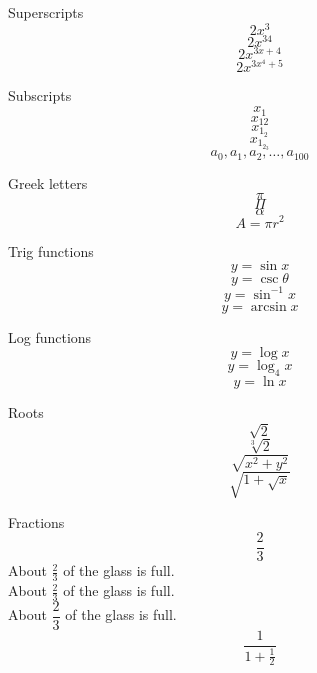 \documentclass[12pt]{article}
\begin{document}
Superscripts $$2x^3$$
$$2x^{34}$$
$$2x^{3x+4}$$
$$2x^{3x^4+5}$$

Subscripts
$$x_1$$
$$x_{12}$$
$$x_{1_2}$$
$$x_{1_{2_3}}$$
$$a_0, a_1, a_2, \ldots, a_{100}$$

Greek letters
$$\pi$$
$$\Pi$$
$$\alpha$$
$$A=\pi r^2$$

Trig functions
$$y=\sin x$$
$$y=\csc \theta$$
$$y=\sin^{-1} x$$
$$y=\arcsin x$$

Log functions	
$$y=\log x$$
$$y=\log_4 x$$
$$y=\ln x$$

Roots
$$\sqrt{2}$$
$$\sqrt[3]{2}$$
$$\sqrt{x^2+y^2}$$
$$\sqrt{ 1+\sqrt{x} }$$

Fractions
$$\frac{2}{3}$$
About $\frac{2}{3}$ of the glass is full.\\[6pt]
About $\displaystyle \frac{2}{3}$ of the glass is full.\\[6pt]
About $\dfrac{2}{3}$ of the glass is full.
$$\frac{1}{1+\frac{1}{2}}$$
\end{document}
